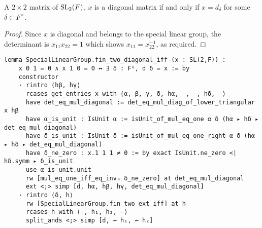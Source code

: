 \begin{corollary}
    \label{SpecialLinearGroup.fin_two_diagonal_iff}
    \leanok
    A $2 \times 2$ matrix of $\operatorname{SL}_2(F)$, $x$ is a diagonal matrix if and only if $x = d_\delta$ for some $\delta \in F^\times$.
\end{corollary}
\begin{proof}
\leanok
    Since $x$ is diagonal and belongs to the special linear group, the determinant is $x_{11} x_{22} = 1$ which shows $x_{11} = x_{22}^{-1}$, as required.
\end{proof}
\begin{footnotesize}
\begin{verbatim}
lemma SpecialLinearGroup.fin_two_diagonal_iff (x : SL(2,F)) :
    x 0 1 = 0 ∧ x 1 0 = 0 ↔ ∃ δ : Fˣ, d δ = x := by
    constructor
    · rintro ⟨hβ, hγ⟩
      rcases get_entries x with ⟨α, β, γ, δ, hα, -, -, hδ, -⟩
      have det_eq_mul_diagonal := det_eq_mul_diag_of_lower_triangular x hβ
      have α_is_unit : IsUnit α := isUnit_of_mul_eq_one α δ (hα ▸ hδ ▸ det_eq_mul_diagonal)
      have δ_is_unit : IsUnit δ := isUnit_of_mul_eq_one_right α δ (hα ▸ hδ ▸ det_eq_mul_diagonal)
      have δ_ne_zero : x.1 1 1 ≠ 0 := by exact IsUnit.ne_zero <| hδ.symm ▸ δ_is_unit
      use α_is_unit.unit
      rw [mul_eq_one_iff_eq_inv₀ δ_ne_zero] at det_eq_mul_diagonal
      ext <;> simp [d, hα, hβ, hγ, det_eq_mul_diagonal]
    · rintro ⟨δ, h⟩
      rw [SpecialLinearGroup.fin_two_ext_iff] at h
      rcases h with ⟨-, h₁, h₂, -⟩
      split_ands <;> simp [d, ← h₁, ← h₂]
\end{verbatim}
\end{footnotesize}

